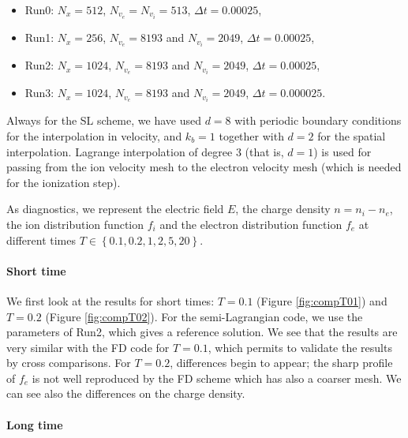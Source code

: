 \documentclass{article}
\numberwithin{equation}{section}
\begin{document}
\begin{itemize}
\item Run0: $N_x=512$, $N_{v_e}=N_{v_i}=513$, $\Delta t = 0.00025$,
\item Run1: $N_x=256$, $N_{v_e}=8193$ and $N_{v_i}=2049$, $\Delta t = 0.00025$,
\item Run2: $N_x=1024$, $N_{v_e}=8193$ and $N_{v_i}=2049$, $\Delta t = 0.00025$,
\item Run3: $N_x=1024$, $N_{v_e}=8193$ and $N_{v_i}=2049$, $\Delta t = 0.000025$.
\end{itemize}

Always for the SL scheme, we have used $d=8$ with periodic boundary conditions for the interpolation in velocity, and $k_b=1$ together with $d=2$ for the spatial interpolation.
Lagrange interpolation of degree $3$  (that is, $d=1$) is used for passing from the ion velocity mesh to the electron velocity mesh (which is needed for the ionization step).

As diagnostics, we represent the electric field $E$, the charge density $n=n_i-n_e$, the ion distribution function $f_i$ and the electron distribution function $f_e$ at different times $T\in \left\{0.1,0.2,1,2,5,20\right\}$.

\paragraph{Short time}

We first look at the results for short times: $T=0.1$ (Figure \ref{fig:compT01}) and $T=0.2$ (Figure \ref{fig:compT02}). For the semi-Lagrangian code, we use the parameters of Run2, which gives a reference solution.
We see that the results are very similar with the FD code for $T=0.1$, which permits to validate the results by cross comparisons. For $T=0.2$, differences begin to appear; the sharp profile of $f_e$ is not well
reproduced by the FD scheme which has also a coarser mesh. We can see also the differences on the charge density.


\paragraph{Long time}
\end{document}
